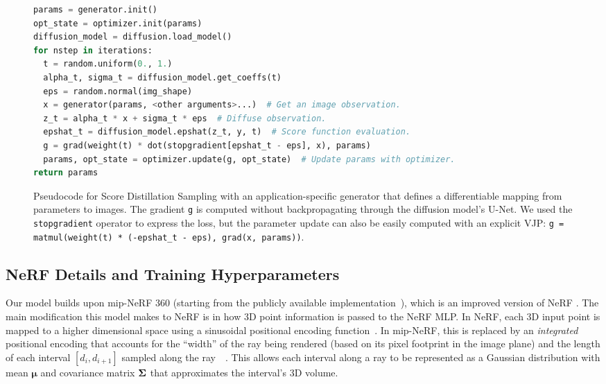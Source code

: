 \documentclass{article} %
\newcommand{\sname}{Score Distillation Sampling\xspace}
\begin{document}
\begin{figure}[h]
\begin{lstlisting}[language=Python]
params = generator.init()
opt_state = optimizer.init(params)
diffusion_model = diffusion.load_model()
for nstep in iterations:
  t = random.uniform(0., 1.)
  alpha_t, sigma_t = diffusion_model.get_coeffs(t)
  eps = random.normal(img_shape)
  x = generator(params, <other arguments>...)  # Get an image observation.
  z_t = alpha_t * x + sigma_t * eps  # Diffuse observation.
  epshat_t = diffusion_model.epshat(z_t, y, t)  # Score function evaluation.
  g = grad(weight(t) * dot(stopgradient[epshat_t - eps], x), params)
  params, opt_state = optimizer.update(g, opt_state)  # Update params with optimizer.
return params
\end{lstlisting}
\caption{Pseudocode for \sname with an application-specific generator that defines a differentiable mapping from parameters to images. The gradient \texttt{g} is computed without backpropagating through the diffusion model's U-Net. We used the \texttt{stopgradient} operator to express the loss, but the parameter update can also be easily computed with an explicit VJP: {\texttt{g = matmul(weight(t) * (-epshat\_t - eps), grad(x, params))}}.}
\label{fig:score_sampling_code}
\end{figure}







\subsection{NeRF Details and Training Hyperparameters}
\label{sec:nerf_hparams}

Our model builds upon mip-NeRF 360 \citep{Barron2021MipNeRF3U} (starting from the publicly available implementation~\citeyear{multinerf2022}), which is an improved version of NeRF \citep{mildenhall2020nerf}. The main modification this model makes to NeRF is in how 3D point information is passed to the NeRF MLP. In NeRF, each 3D input point is mapped to a higher dimensional space using a sinusoidal positional encoding function~\citep{vaswani2017attention}. In mip-NeRF, this is replaced by an \emph{integrated} positional encoding that accounts for the ``width'' of the ray being rendered (based on its pixel footprint in the image plane) and the length of each interval $[d_i, d_{i+1}]$ sampled along the ray~~\citep{barron2021mip}. This allows each interval along a ray to be represented as a Gaussian distribution with mean $\boldsymbol \mu$ and covariance matrix $\boldsymbol{\Sigma}$ that approximates the interval's 3D volume.
\end{document}

